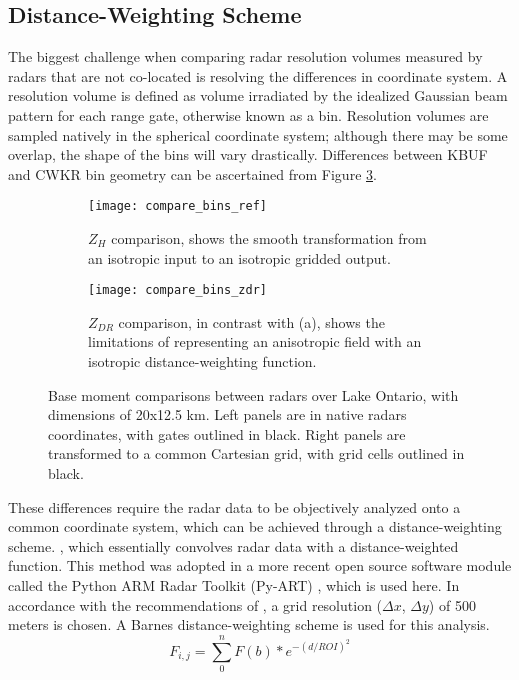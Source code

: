 \subsection{Distance-Weighting Scheme}
The biggest challenge when comparing radar resolution volumes measured by radars that are not co-located is resolving the differences in coordinate system. A resolution volume is defined as volume irradiated by the idealized Gaussian beam pattern for each range gate, otherwise known as a bin. Resolution volumes are sampled natively in the spherical coordinate system; although there may be some overlap, the shape of the bins will vary drastically. Differences between KBUF and CWKR bin geometry can be ascertained from Figure \ref{fig:compare_bins}. 
\begin{figure}[H]
\centering
   \begin{subfigure}{1.0\textwidth} \centering
     \texttt{[image: compare\_bins\_ref]}
     \caption{$Z_H$ comparison, shows the smooth transformation from an isotropic input to an isotropic gridded output.}\label{fig:compare_ref}
   \end{subfigure}
   \begin{subfigure}{1.0\textwidth} \centering
     \texttt{[image: compare\_bins\_zdr]}
     \caption{$Z_{DR}$ comparison, in contrast with (a), shows the limitations of representing an anisotropic field with an isotropic distance-weighting function. }\label{fig:compare_zdr}
   \end{subfigure}
\caption{Base moment comparisons between radars over Lake Ontario, with dimensions of 20x12.5 km. Left panels are in native radars coordinates, with gates outlined in black. Right panels are transformed to a common Cartesian grid, with grid cells outlined in black.} \label{fig:compare_bins}
\end{figure}
These differences require the radar data to be objectively analyzed onto a common coordinate system, which can be achieved through a distance-weighting scheme.  , which essentially convolves radar data with a distance-weighted function. This method was adopted in a more recent open source software module called the Python ARM Radar Toolkit (Py-ART) \citep{Py-ART}, which is used here. In accordance with the recommendations of \cite{Pauly1990}, a grid resolution ($\Delta x$, $\Delta y$) of 500 meters is chosen. A Barnes distance-weighting scheme is used for this analysis. 
\begin{equation}\label{eq:barnesdws}
F_{i,j} = \sum_0^n F(b) * e^{-(d/ROI)^{2}}
\end{equation}
